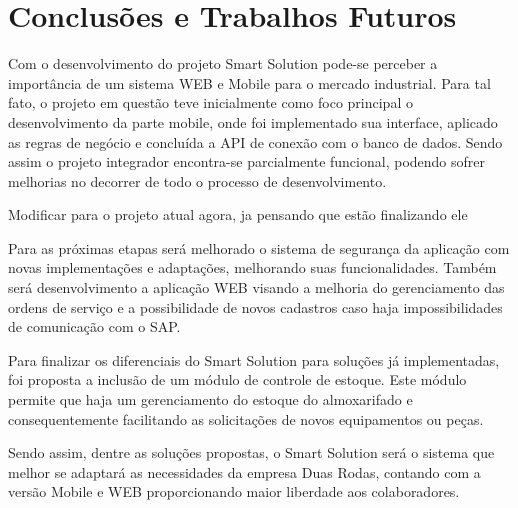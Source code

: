 \chapter{Conclusões e Trabalhos Futuros}

Com o desenvolvimento do projeto Smart Solution pode-se perceber a importância de um sistema WEB e Mobile para o mercado industrial. Para tal fato, o projeto em questão teve inicialmente como foco principal o desenvolvimento da parte mobile, onde foi implementado sua interface, aplicado as regras de negócio e concluída a API de conexão com o banco de dados. Sendo assim o projeto integrador encontra-se parcialmente funcional, podendo sofrer melhorias no decorrer de todo o processo de desenvolvimento.


{\color{red} Modificar para o projeto atual agora, ja pensando que estão finalizando ele

Para as próximas etapas será melhorado o sistema de segurança da aplicação com novas implementações e adaptações, melhorando suas funcionalidades. Também será desenvolvimento a aplicação WEB visando a melhoria do gerenciamento das ordens de serviço e a possibilidade de novos cadastros caso haja impossibilidades de comunicação com o SAP.

Para finalizar os diferenciais do Smart Solution para soluções já implementadas, foi proposta a inclusão de um módulo de controle de estoque. Este módulo permite que haja um gerenciamento do estoque do almoxarifado e consequentemente facilitando as solicitações de novos equipamentos ou peças.

Sendo assim, dentre as soluções propostas, o Smart Solution será o sistema que melhor se adaptará as necessidades da empresa Duas Rodas, contando com a versão Mobile e WEB proporcionando maior liberdade aos colaboradores.

}








